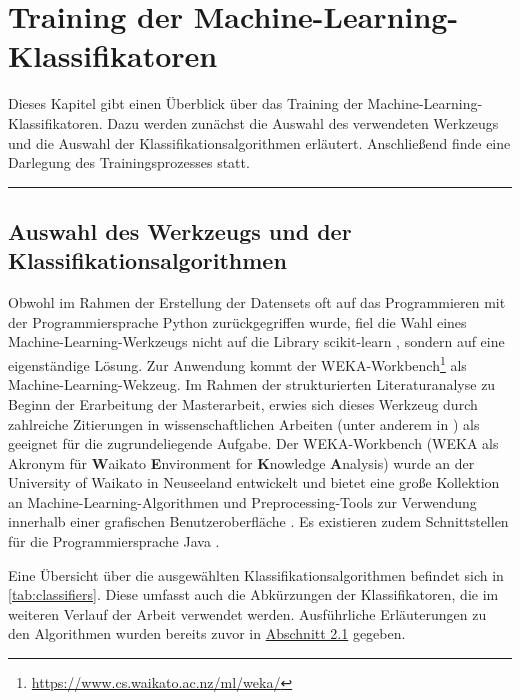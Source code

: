 
\chapter{Training der Machine-Learning-Klassifikatoren}
\label{training}

Dieses Kapitel gibt einen Überblick über das Training der Machine-Learning-Klassifikatoren. Dazu werden zunächst die Auswahl des verwendeten Werkzeugs und die Auswahl der Klassifikationsalgorithmen erläutert. Anschließend finde eine Darlegung des Trainingsprozesses statt.
\\
\hrule

\section{Auswahl des Werkzeugs und der Klassifikationsalgorithmen}

Obwohl im Rahmen der Erstellung der Datensets oft auf das Programmieren mit der Programmiersprache Python zurückgegriffen wurde, fiel die Wahl eines Machine-Learning-Werkzeugs nicht auf die Library scikit-learn \cite{scikit}, sondern auf eine eigenständige Lösung. Zur Anwendung kommt der WEKA-Workbench\footnote{\href{https://www.cs.waikato.ac.nz/ml/weka/}{https://www.cs.waikato.ac.nz/ml/weka/}} als Machine-Learning-Wekzeug. Im Rahmen der strukturierten Literaturanalyse zu Beginn der Erarbeitung der Masterarbeit, erwies sich dieses Werkzeug durch zahlreiche Zitierungen in wissenschaftlichen Arbeiten (unter anderem in \cite{Hammouri2018,Queiroz2016,Ratzinger2008}) als geeignet für die zugrundeliegende Aufgabe. Der WEKA-Workbench (WEKA als Akronym für \textbf{W}aikato \textbf{E}nvironment for \textbf{K}nowledge \textbf{A}nalysis) wurde an der University of Waikato in Neuseeland entwickelt und bietet eine große Kollektion an Machine-Learning-Algorithmen und Preprocessing-Tools zur Verwendung innerhalb einer grafischen Benutzeroberfläche \cite{Weka2016}. Es existieren zudem Schnittstellen für die Programmiersprache Java \cite{Weka2016}.

Eine Übersicht über die ausgewählten Klassifikationsalgorithmen befindet sich in \autoref{tab:classifiers}. Diese umfasst auch die Abkürzungen der Klassifikatoren, die im weiteren Verlauf der Arbeit verwendet werden. Ausführliche Erläuterungen zu den Algorithmen wurden bereits zuvor in \hyperref[algorithms]{Abschnitt 2.1} gegeben.

